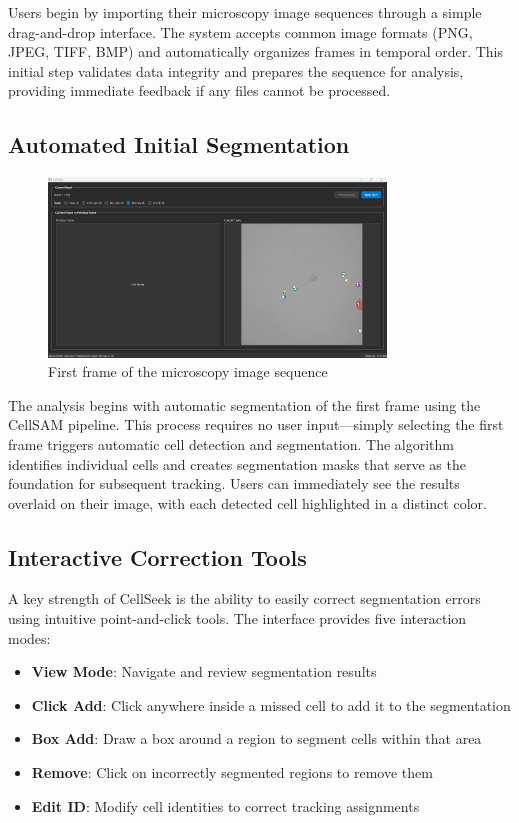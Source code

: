 \documentclass[../cellseek_paper.tex]{subfiles}
\begin{document}
Users begin by importing their microscopy image sequences through a simple drag-and-drop interface. The system accepts common image formats (PNG, JPEG, TIFF, BMP) and automatically organizes frames in temporal order. This initial step validates data integrity and prepares the sequence for analysis, providing immediate feedback if any files cannot be processed.

\subsection{Automated Initial Segmentation}

\begin{figure}[H]
  \centering
  \includegraphics[width=0.8\textwidth]{images/ui/first_frame.jpg}
  \caption{First frame of the microscopy image sequence}
  \label{fig:first_frame}
\end{figure}

The analysis begins with automatic segmentation of the first frame using the CellSAM pipeline. This process requires no user input—simply selecting the first frame triggers automatic cell detection and segmentation. The algorithm identifies individual cells and creates segmentation masks that serve as the foundation for subsequent tracking. Users can immediately see the results overlaid on their image, with each detected cell highlighted in a distinct color.

\subsection{Interactive Correction Tools}

A key strength of CellSeek is the ability to easily correct segmentation errors using intuitive point-and-click tools. The interface provides five interaction modes:

\begin{itemize}
  \item \textbf{View Mode}: Navigate and review segmentation results
  \item \textbf{Click Add}: Click anywhere inside a missed cell to add it to the segmentation
  \item \textbf{Box Add}: Draw a box around a region to segment cells within that area
  \item \textbf{Remove}: Click on incorrectly segmented regions to remove them
  \item \textbf{Edit ID}: Modify cell identities to correct tracking assignments
\end{itemize}
\end{document}
